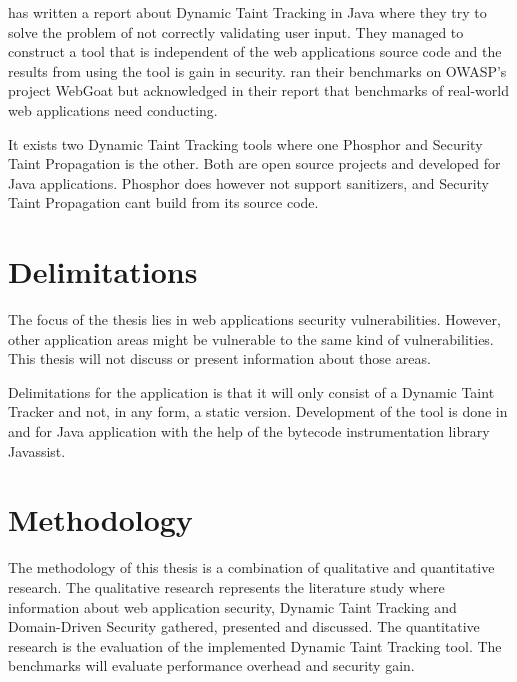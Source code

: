 \textcite{Haldar} has written a report about Dynamic Taint Tracking in Java where they try to solve the problem of not correctly validating user input. They managed to construct a tool that is independent of the web applications source code and the results from using the tool is gain in security. \textcite{Haldar} ran their benchmarks on OWASP’s project WebGoat \parencite{webgoat} but acknowledged in their report that benchmarks of real-world web applications need conducting.

It exists two Dynamic Taint Tracking tools where one Phosphor \parencite{phosphor} and Security Taint Propagation \parencite{securityTaint} is the other. Both are open source projects and developed for Java applications. Phosphor does however not support sanitizers, and Security Taint Propagation cant build from its source code.


\section{Delimitations}
\label{Delimitations}
The focus of the thesis lies in web applications security vulnerabilities. However, other application areas might be vulnerable to the same kind of vulnerabilities.  This thesis will not discuss or present information about those areas.

Delimitations for the application is that it will only consist of a Dynamic Taint Tracker and not, in any form, a static version. Development of the tool is done in and for Java application with the help of the bytecode instrumentation library Javassist.


\section{Methodology}
\label{Methodology}
The methodology of this thesis is a combination of qualitative and quantitative research. The qualitative research represents the literature study where information about web application security, Dynamic Taint Tracking and Domain-Driven Security gathered, presented and discussed. The quantitative research is the evaluation of the implemented Dynamic Taint Tracking tool. The benchmarks will evaluate performance overhead and security gain.
